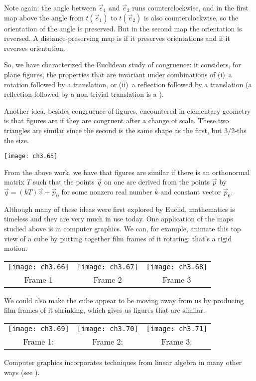 Note again:  
the angle between $\vec{e}_1$ and $\vec{e}_2$ runs counterclockwise,
and in the first map above the angle from 
$t(\vec{e}_1)$ to $t(\vec{e}_2)$ is also counterclockwise,
so the orientation of the angle is preserved.
But in the second map the orientation is reversed.
A distance-preserving map is 
 if it 
preserves orientations
and  
if it reverses orientation.

So, we have characterized the Euclidean study of congruence:
it considers, for plane figures, the properties that are invariant 
under combinations of (i)~a rotation followed by a translation,
or (ii)~a reflection followed by a translation
(a reflection followed by a non-trivial 
translation is a ).

Another idea, besides congruence of figures, encountered in 
elementary geometry is
that figures are  
if they are congruent after a change of scale. 
These two triangles are similar since the second is 
the same shape as the first, but $3/2$-ths the size.
\begin{center}
  \texttt{[image: ch3.65]}
\end{center}
From the above work, we have that figures are similar if there
is an orthonormal matrix $T$ such that the points $\vec{q}$ 
on one are derived from
the points $\vec{p}$ by 
$\vec{q}=(kT)\vec{v}+\vec{p}_0$
for some nonzero real number $k$ and constant vector $\vec{p}_0$.

Although many of these ideas were first 
explored by Euclid, mathematics is timeless and
they are very much in use today. 
One application of the maps studied above is in computer graphics.
We can, for example, animate this top view of a cube 
by putting together film frames of it rotating; that's a rigid motion. 
\begin{center}
  \begin{tabular}{ccc}
    \texttt{[image: ch3.66]}
    &\texttt{[image: ch3.67]}
    &\texttt{[image: ch3.68]}                       \\
    Frame 1      &Frame 2       &Frame 3       
  \end{tabular}
\end{center}
We could also make the cube appear to be moving away from us by producing film
frames of it shrinking, which gives us figures that are similar.
\begin{center}
  \begin{tabular}{ccc}
    \texttt{[image: ch3.69]}
    &\texttt{[image: ch3.70]}
    &\texttt{[image: ch3.71]}                       \\
    Frame 1:        &Frame 2:       &Frame 3:        
  \end{tabular}
\end{center}
Computer graphics incorporates techniques
from linear algebra in many other ways (see ).

